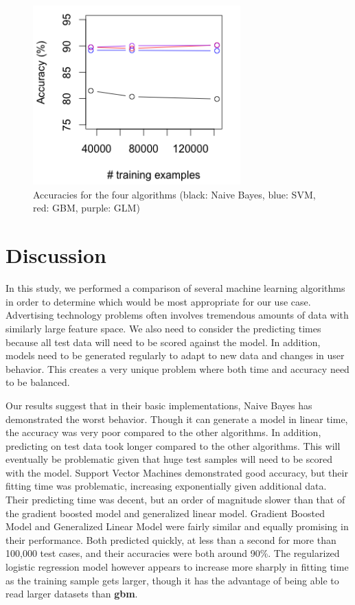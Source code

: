 \documentclass[twoside]{article}
\begin{document}
\begin{multicols}{2}
\begin{figure}[H]
 \caption{Accuracies for the four algorithms (black: Naive Bayes, blue: SVM, red: GBM, purple: GLM)}
  \centering
    \includegraphics[width=8cm]{../data/all_acc}
\end{figure}


\section{Discussion}

In this study, we performed a comparison of several machine learning algorithms in order to determine which would be most appropriate for our use case. Advertising technology problems often involves tremendous amounts of data with similarly large feature space. We also need to consider the predicting times because all test data will need to be scored against the model. In addition, models need to be generated regularly to adapt to new data and changes in user behavior. This creates a very unique problem where both time and accuracy need to be balanced.

Our results suggest that in their basic implementations, Naive Bayes has demonstrated the worst behavior. Though it can generate a model in linear time, the accuracy was very poor compared to the other algorithms. In addition, predicting on test data took longer compared to the other algorithms. This will eventually be problematic given that huge test samples will need to be scored with the model. Support Vector Machines demonstrated good accuracy, but their fitting time was problematic, increasing exponentially given additional data. Their predicting time was decent, but an order of magnitude slower than that of the gradient boosted model and generalized linear model. Gradient Boosted Model and Generalized Linear Model were fairly similar and equally promising in their performance. Both predicted quickly, at less than a second for more than 100,000 test cases, and their accuracies were both around 90\%. The regularized logistic regression model however appears to increase more sharply in fitting time as the training sample gets larger, though it has the advantage of being able to read larger datasets than \textbf{gbm}.


\end{multicols}
\end{document}
